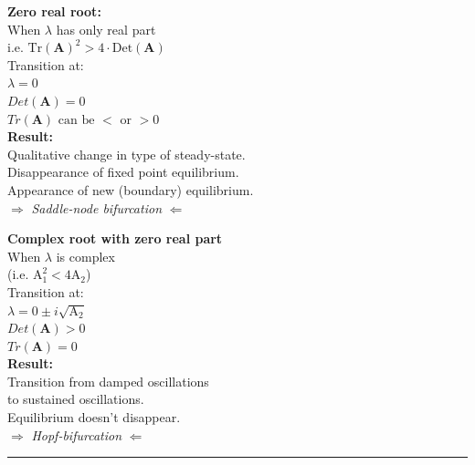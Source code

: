\documentclass{article}
\newcommand{\ind}{\-\hspace{1cm}}
\begin{document}
\begin{minipage}[t]{\dimexpr.5\textwidth-.5\columnsep}
\textbf{Zero real root:}\\
\ind When $\lambda$ has only real part\\
\ind \ind i.e. $\text{Tr}(\textbf{A})^2 > 4\cdot\text{Det}(\textbf{A})$\\
\ind Transition at:\\
\ind \ind $\lambda = 0$\\
\ind \ind $ Det(\mathbf{A})=0$\\
\ind \ind $Tr(\mathbf{A}) \text{ can be } < \text{ or } > 0$\\

\textbf{Result:}\\
Qualitative change in type of steady-state.\\
Disappearance of fixed point equilibrium.\\
Appearance of new (boundary) equilibrium.\\

\ind $\Rightarrow$ \emph{Saddle-node bifurcation} $\Leftarrow$
\end{minipage} %
\begin{minipage}[t]{\dimexpr.5\textwidth-.5\columnsep}
\textbf{Complex root with zero real part}\\
\ind When $\lambda$ is complex\\
\ind \ind (i.e. $\text{A}_1^2 < 4\text{A}_2$)\\
\ind Transition at:\\
\ind \ind $\lambda = 0 \pm i \sqrt{\text{A}_2}$\\
\ind \ind $Det(\mathbf{A})>0$\\
\ind \ind $Tr(\mathbf{A})=0$\\

\textbf{Result:}\\
Transition from damped oscillations\\
\ind to sustained oscillations.\\
Equilibrium doesn't disappear.\\

\ind \ind $\Rightarrow$ \emph{Hopf-bifurcation}  $\Leftarrow$
\end{minipage}


\rule[0.5ex]{\linewidth}{1pt}
\end{document}
